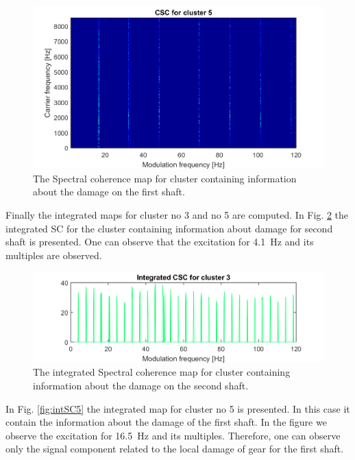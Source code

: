 \documentclass[11pt]{article}
\begin{document}
\begin{figure}[h!]
\begin{center}
\includegraphics[width=\textwidth]{wykresy/212_SC_cluster_5.png}
\caption{The Spectral coherence map for cluster containing information about the damage on the first shaft.}
\label{fig:SC_cluster5}
\end{center}
\end{figure}
%
Finally the integrated maps for cluster no 3 and no 5 are computed. In Fig. \ref{fig:intSC3} the integrated SC for the cluster containing information about damage for second shaft is presented. One can observe that the excitation for 4.1~Hz and its multiples are observed. 
\begin{figure}[h!]
\begin{center}
\includegraphics[width=\textwidth]{wykresy/212_cluster_sum_3.png}
\caption{The integrated Spectral coherence map for cluster containing information about the damage on the second shaft.}
\label{fig:intSC3}
\end{center}
\end{figure}
In Fig. \ref{fig:intSC5} the integrated map for cluster no 5 is presented. In this case it contain the information about the damage of the first shaft. In the figure we observe the excitation for 16.5~Hz and its multiples. Therefore, one can observe only the signal component related to the local damage of gear for the first shaft.
\end{document}
